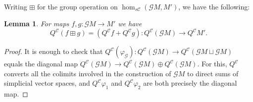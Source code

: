 \documentclass[11pt]{amsart} \renewcommand{\baselinestretch}{1.2}
\theoremstyle{plain}
\newtheorem{lem}[thm]{Lemma}
\numberwithin{equation}{section} %
\theoremstyle{plain}
\newtheorem{lem}[thm]{Lemma}
\numberwithin{equation}{chapter} %
\let\phi\varphi
\renewcommand{\to}{\longrightarrow}
\newcommand{\scrG}{\mathscr{G}}
\newcommand{\calc}{\mathcal{C}}
\newcommand{\BSW}{{\scrG}}
\newcommand{\Id}{\mathrm{id}}
\begin{document}
\begin{Comp funct sseqs}
Writing $\boxplus$ for the group operation on $\hom_{s\calc}(\BSW M,M')$, we have the following:
\begin{lem}
For maps $f,g:\BSW M\to M'$ we have 
\[Q^{\calc}(f\boxplus g)=(Q^{\calc}f+Q^{\calc}g):Q^{\calc}(\BSW M)\to Q^{\calc}M'.\]
\end{lem}
\begin{proof}
It is enough to check that $Q^{\calc}(\phi_\BSW ):Q^{\calc}(\BSW M)\to Q^{\calc}(\BSW M\sqcup \BSW M)$ equals the diagonal map $Q^{\calc}(\BSW M)\to Q^{\calc}(\BSW M)\oplus Q^{\calc}(\BSW M)$. For this, $Q^{\calc}$ converts all the colimits involved in the construction of $\BSW M$ to direct sums of simplicial vector spaces, and $Q^{\calc}\phi_1$ and $Q^{\calc}\phi_2$ are both precisely the diagonal map.
\end{proof}


\end{Comp funct sseqs}
\end{document}
